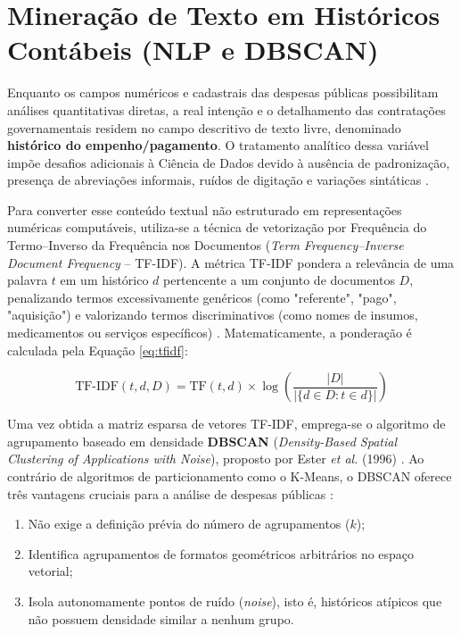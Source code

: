 \documentclass[
    12pt,               %
    openright,          %
    oneside,            %
    a4paper,            %
    chapter=TITLE,      %
    sumario=tradicional,%
    english,            %
    brazilian,          %
 ]{abntex2}
\begin{document}
\section{Mineração de Texto em Históricos Contábeis (NLP e DBSCAN)}\label{sec:nlp_dbscan}

Enquanto os campos numéricos e cadastrais das despesas públicas possibilitam análises quantitativas diretas, a real intenção e o detalhamento das contratações governamentais residem no campo descritivo de texto livre, denominado \textbf{histórico do empenho/pagamento}. O tratamento analítico dessa variável impõe desafios adicionais à Ciência de Dados devido à ausência de padronização, presença de abreviações informais, ruídos de digitação e variações sintáticas \cite{goldschmidt2005, pereira2025}.

Para converter esse conteúdo textual não estruturado em representações numéricas computáveis, utiliza-se a técnica de vetorização por Frequência do Termo--Inverso da Frequência nos Documentos (\textit{Term Frequency--Inverse Document Frequency} -- TF-IDF). A métrica TF-IDF pondera a relevância de uma palavra $t$ em um histórico $d$ pertencente a um conjunto de documentos $D$, penalizando termos excessivamente genéricos (como "referente", "pago", "aquisição") e valorizando termos discriminativos (como nomes de insumos, medicamentos ou serviços específicos) \cite{goldschmidt2005}. Matematicamente, a ponderação é calculada pela Equação \ref{eq:tfidf}:

\begin{equation}\label{eq:tfidf}
\text{TF-IDF}(t, d, D) = \text{TF}(t, d) \times \log\left(\frac{|D|}{|\{d \in D : t \in d\}|}\right)
\end{equation}

Uma vez obtida a matriz esparsa de vetores TF-IDF, emprega-se o algoritmo de agrupamento baseado em densidade \textbf{DBSCAN} (\textit{Density-Based Spatial Clustering of Applications with Noise}), proposto por Ester \textit{et al.} (1996) \cite{ester1996dbscan}. Ao contrário de algoritmos de particionamento como o K-Means, o DBSCAN oferece três vantagens cruciais para a análise de despesas públicas \cite{ester1996dbscan, vieira2019}:
\begin{enumerate}
    \item Não exige a definição prévia do número de agrupamentos ($k$);
    \item Identifica agrupamentos de formatos geométricos arbitrários no espaço vetorial;
    \item Isola autonomamente pontos de ruído (\textit{noise}), isto é, históricos atípicos que não possuem densidade similar a nenhum grupo.
\end{enumerate}
\end{document}

